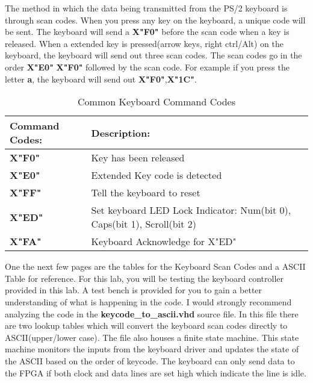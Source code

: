 \documentclass{article}
\begin{document}
The method in which the data being transmitted from the PS/2 keyboard is through scan codes. When you press any key on the keyboard, a unique code will be sent. The keyboard will send a \textbf{X"F0"} before the scan code when a key is released. When a extended key is pressed(arrow keys, right ctrl/Alt) on the keyboard, the keyboard will send out three scan codes. The scan codes go in the order \textbf{X"E0"} \textbf{X"F0"} followed by the scan code. For example if you press the letter \textbf{a}, the keyboard will send out \textbf{X"F0"},\textbf{X"1C"}.

\begin{table}[!htbp]
  \begin{center}
    \begin{tabular}{|l|l|}
       \hline
       \large{\textbf{Command Codes:}} & \large{\textbf{Description:}} \\
       \hline 
       \textbf{X"F0"} & Key has been released \\
       \textbf{X"E0"} & Extended Key code is detected \\
       \textbf{X"FF"} & Tell the keyboard to reset \\
       \textbf{X"ED"} & Set keyboard LED Lock Indicator: Num(bit 0), Caps(bit 1), Scroll(bit 2) \\
       \textbf{X"FA"} & Keyboard Acknowledge for X"ED" \\
       \hline
    \end{tabular}
  \end{center}
  \caption{Common Keyboard Command Codes}
\end{table}

One the next few pages are the tables for the Keyboard Scan Codes and a ASCII Table for reference. For this lab, you will be testing the keyboard controller provided in this lab. A test bench is provided for you to gain a better understanding of what is happening in the code. I would strongly recommend analyzing the code in the \textbf{keycode\_to\_ascii.vhd} source file. In this file there are two lookup tables which will convert the keyboard scan codes directly to ASCII(upper/lower case). The file also houses a finite state machine. This state machine monitors the inputs from the keyboard driver and updates the state of the ASCII based on the order of keycode. The keyboard can only send data to the FPGA if both clock and data lines are set high which indicate the line is idle.
\end{document}

